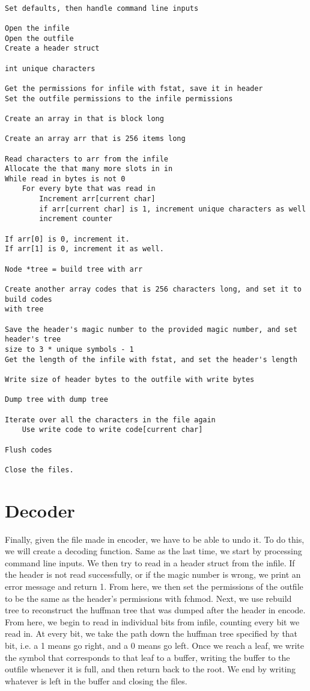 \documentclass[11pt]{article}
\begin{document}
\begin{verbatim}

Set defaults, then handle command line inputs

Open the infile
Open the outfile
Create a header struct

int unique characters

Get the permissions for infile with fstat, save it in header
Set the outfile permissions to the infile permissions

Create an array in that is block long

Create an array arr that is 256 items long

Read characters to arr from the infile
Allocate the that many more slots in in
While read in bytes is not 0
    For every byte that was read in
        Increment arr[current char]
        if arr[current char] is 1, increment unique characters as well
        increment counter

If arr[0] is 0, increment it.
If arr[1] is 0, increment it as well.

Node *tree = build tree with arr

Create another array codes that is 256 characters long, and set it to build codes
with tree

Save the header's magic number to the provided magic number, and set header's tree
size to 3 * unique symbols - 1
Get the length of the infile with fstat, and set the header's length

Write size of header bytes to the outfile with write bytes

Dump tree with dump tree

Iterate over all the characters in the file again
    Use write code to write code[current char]

Flush codes

Close the files.

\end{verbatim}

\section{Decoder}

Finally, given the file made in encoder, we have to be able to undo it. To do this, we will create a decoding function. Same as the last time, we start by processing command line inputs. We then try to read in a header struct from the infile. If the header is not read successfully, or if the magic number is wrong, we print an error message and return 1. From here, we then set the permissions of the outfile to be the same as the header's permissions with fchmod. Next, we use rebuild tree to reconstruct the huffman tree that was dumped after the header in encode. From here, we begin to read in individual bits from infile, counting every bit we read in. At every bit, we take the path down the huffman tree specified by that bit, i.e. a 1 means go right, and a 0 means go left. Once we reach a leaf, we write the symbol that corresponds to that leaf to a buffer, writing the buffer to the outfile whenever it is full, and then return back to the root. We end by writing whatever is left in the buffer and closing the files.
\end{document}
